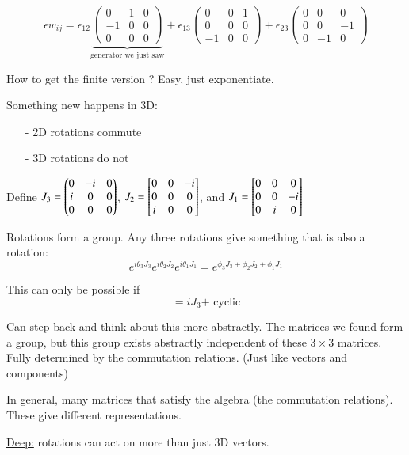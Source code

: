 {\begin{equation*}
\epsilon w_{ij} = \epsilon_{12}\underbrace{{\begin{pmatrix} 0 & 1 & 0  \\ -1 & 0 & 0 \\ 0 & 0 & 0 \end{pmatrix}}}_{\text{generator we just saw}} + 
                  \epsilon_{13}{\begin{pmatrix} 0 & 0 & 1  \\ 0 & 0 & 0 \\ -1 & 0 & 0 \end{pmatrix}} +
                  \epsilon_{23}{\begin{pmatrix} 0 & 0 & 0  \\ 0 & 0 & -1 \\ 0 & -1 & 0 \end{pmatrix}}
\end{equation*}

How to get the finite version ? 
Easy, just exponentiate. 

Something new happens in 3D:
\begin{itemize}
\item[-]2D rotations commute        
\item[-]3D rotations do not
\end{itemize}

Define $J_3 = \begin{pmatrix} 0 & -i & 0 \\ i & 0 & 0 \\ 0 & 0 & 0 \end{pmatrix}$, $J_2 = \begin{bmatrix} 0 & 0 & -i \\ 0 & 0 & 0 \\ i & 0 & 0 \end{bmatrix}$, and $J_1 = \begin{bmatrix} 0 & 0 & 0 \\ 0 & 0 & -i \\ 0 & i & 0 \end{bmatrix}$

Rotations form a group.
Any three rotations give something that is also a rotation: 
\begin{equation*}
e^{i\theta_3 J_3}e^{i\theta_2 J_2}e^{i\theta_1 J_1} = e^{\phi_3 J_3 + \phi_2 J_2 + \phi_1 J_1}
\end{equation*}

This can only be possible if
\begin{equation*}
[J_1, J_2] = i J_3  \textrm{+ cyclic}
\end{equation*}


Can step back and think about this more abstractly. 
The matrices  we found form a group, but this group exists abstractly independent of these $3\times3$ matrices.
Fully determined by the commutation relations.
(Just like vectors and components)

In general, many matrices that satisfy the algebra (the commutation relations). 
These give different representations.

\underline{Deep:} rotations can act on more than just 3D vectors.

}
